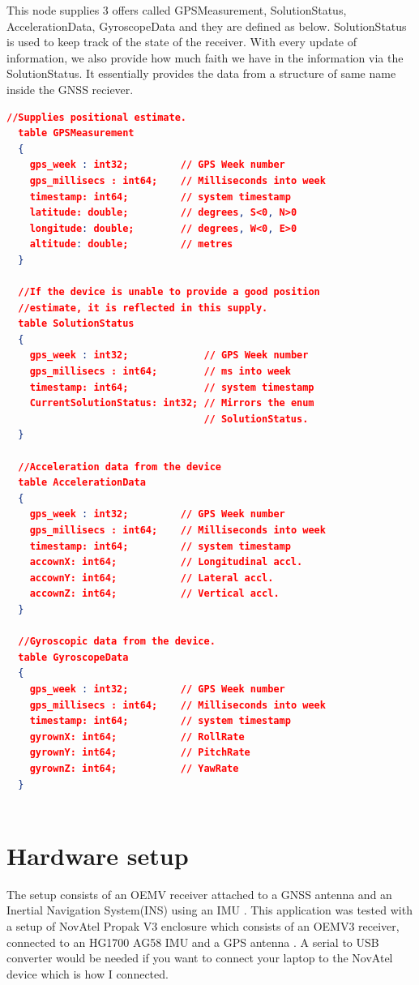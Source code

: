\documentclass[a4paper, 12pt, oneside]{report}
\begin{document}
  This node supplies 3 offers called GPSMeasurement, SolutionStatus, AccelerationData, GyroscopeData and they are defined as below. SolutionStatus is used to keep track of the state of the receiver. With every update of information, we also provide how much faith we have in the information via the SolutionStatus. It essentially provides the data from a structure of same name \cite{-2020-01-31} inside the GNSS reciever.

  \begin{lstlisting}[language=json,firstnumber=1]
  //Supplies positional estimate.
  table GPSMeasurement 
  {
    gps_week : int32;         // GPS Week number 
    gps_millisecs : int64;    // Milliseconds into week
    timestamp: int64;         // system timestamp
    latitude: double;         // degrees, S<0, N>0
    longitude: double;        // degrees, W<0, E>0
    altitude: double;         // metres
  }
  
  //If the device is unable to provide a good position
  //estimate, it is reflected in this supply.
  table SolutionStatus
  {
    gps_week : int32;             // GPS Week number
    gps_millisecs : int64;        // ms into week
    timestamp: int64;             // system timestamp
    CurrentSolutionStatus: int32; // Mirrors the enum 
                                  // SolutionStatus. 
  }
  
  //Acceleration data from the device
  table AccelerationData
  {
    gps_week : int32;         // GPS Week number 
    gps_millisecs : int64;    // Milliseconds into week
    timestamp: int64;         // system timestamp
    accownX: int64;           // Longitudinal accl.
    accownY: int64;           // Lateral accl.    
    accownZ: int64;           // Vertical accl.
  }
  
  //Gyroscopic data from the device.
  table GyroscopeData
  {
    gps_week : int32;         // GPS Week number 
    gps_millisecs : int64;    // Milliseconds into week 
    timestamp: int64;         // system timestamp
    gyrownX: int64;           // RollRate 
    gyrownY: int64;           // PitchRate 
    gyrownZ: int64;           // YawRate
  }
  
  \end{lstlisting}
  
  \section{Hardware setup}
  The setup consists of an OEMV receiver attached to a GNSS antenna and an Inertial Navigation System(INS) using an IMU \cite{ProPakV3TripleFrequencyGNSSReceiverHighPrecisionGNSSGPSReceiversNovAtelGNSSReceiverNovAtel-2020-02-12}. This application was tested with a setup of NovAtel Propak V3 enclosure which consists of an OEMV3 receiver, connected to an HG1700 AG58 IMU and a GPS antenna \cite{ProPakV3TripleFrequencyGNSSReceiverHighPrecisionGNSSGPSReceiversNovAtelGNSSReceiverNovAtel-2020-02-12}. A serial to USB converter would be needed if you want to connect your laptop to the NovAtel device which is how I connected.
  
\end{document}
